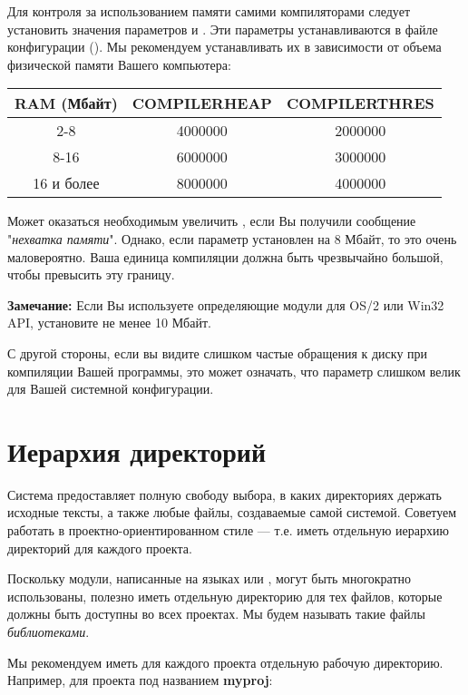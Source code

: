 Для контроля за использованием памяти самими компиляторами следует установить 
значения параметров  и .
Эти параметры устанавливаются в файле конфигурации ({\tt \cfg{}}).
Мы рекомендуем устанавливать их в зависимости от объема физической памяти
Вашего компьютера:
\begin{flushleft}
\begin{tabular}{c|c|c}
RAM (Мбайт)      & COMPILERHEAP & COMPILERTHRES \\ \hline
2-8              &    4000000   & 2000000  \\
8-16             &    6000000   & 3000000  \\
16 и более       &    8000000   & 4000000  \\
\end{tabular}
\end{flushleft}
Может оказаться необходимым увеличить
, если Вы получили сообщение 
"{\em нехватка памяти}".
Однако, если параметр  установлен на 8 Мбайт, 
то это очень маловероятно. Ваша единица компиляции должна быть
чрезвычайно большой, чтобы превысить эту границу.

{\bf Замечание:} Если Вы используете определяющие модули для
OS/2 или Win32 API, установите  
не менее 10 Мбайт.

С другой стороны, если вы видите слишком частые обращения к диску
при компиляции Вашей программы, это может означать, что параметр
 слишком велик для Вашей системной конфигурации.

\section{Иерархия директорий}

Система \xds{} предоставляет полную свободу выбора, в каких директориях
держать исходные тексты, а также любые файлы, создаваемые самой системой.
Советуем работать в проектно-ориентированном стиле --- т.е. иметь
отдельную иерархию директорий для каждого проекта.

Поскольку модули, написанные на языках \mt{} или \ot{}, могут быть
многократно использованы, полезно иметь отдельную директорию для 
тех файлов, которые должны быть доступны во всех проектах. Мы будем
называть такие файлы {\em библиотеками}.

Мы рекомендуем иметь для каждого проекта отдельную рабочую директорию.
Например, для проекта под названием {\bf myproj}:

